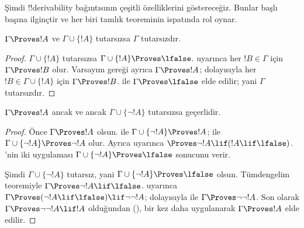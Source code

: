 

      {}
      {}


Şimdi !!{derivability} bağıntısının çeşitli özelliklerini göstereceğiz. Bunlar
başlı başına ilginçtir ve her biri tamlık teoreminin ispatında rol oynar.

\begin{prop}
  $\Gamma \Proves !A$ ve $\Gamma \cup \{!A\}$ tutarsızsa $\Gamma$
  tutarsızdır.
\end{prop}

\begin{proof}
  $\Gamma \cup \{!A\}$ tutarsızsa $\Gamma \cup \{!A\} \Proves \lfalse$.
   uyarınca her $!B \in \Gamma$ için
  $\Gamma \Proves !B$ olur. Varsayım gereği ayrıca $\Gamma \Proves !A$;
  dolayısıyla her $!B \in \Gamma \cup \{!A\}$ için $\Gamma \Proves !B$.
   ile $\Gamma \Proves \lfalse$ elde edilir;
  yani $\Gamma$ tutarsızdır.
\end{proof}

\begin{prop}
$\Gamma \Proves !A$ ancak ve ancak $\Gamma \cup \{\lnot !A\}$ tutarsızsa
geçerlidir.
\end{prop}

\begin{proof}
Önce $\Gamma \Proves !A$ olsun.  ile
$\Gamma \cup \{\lnot !A\} \Proves !A$;  ile
$\Gamma \cup \{\lnot !A\} \Proves \lnot !A$ olur. Ayrıca
 uyarınca $\Proves \lnot !A \lif (!A \lif \lfalse)$.
'nin iki uygulaması $\Gamma \cup \{\lnot !A\}
\Proves \lfalse$ sonucunu verir.

Şimdi $\Gamma \cup \{\lnot !A\}$ tutarsız, yani $\Gamma \cup \{\lnot
!A\} \Proves \lfalse$ olsun. Tümdengelim teoremiyle $\Gamma \Proves
\lnot !A \lif \lfalse$.  uyarınca
$\Gamma \Proves (\lnot !A \lif \lfalse) \lif \lnot\lnot !A$; dolayısıyla
 ile $\Gamma \Proves \lnot\lnot !A$. Son olarak
$\Gamma \Proves \lnot\lnot !A \lif !A$ olduğundan
(),  bir kez daha uygulanarak
$\Gamma \Proves !A$ elde edilir.
\end{proof}

